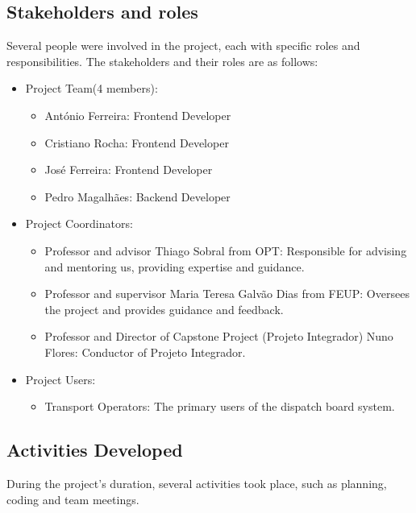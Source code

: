 \documentclass[10pt]{article}
\begin{document}
    \subsection{Stakeholders and roles}
        Several people were involved in the project, each with specific roles and responsibilities. The stakeholders and their roles are as follows:
        \begin{itemize}
            \item Project Team(4 members):
            \begin{itemize}
                \item António Ferreira: Frontend Developer
                \item Cristiano Rocha: Frontend Developer
                \item José Ferreira: Frontend Developer
                \item Pedro Magalhães: Backend Developer
            \end{itemize}
            \item Project Coordinators:
            \begin{itemize}
                \item Professor and advisor Thiago Sobral from OPT: Responsible for advising and mentoring us, providing expertise and guidance.
                \item Professor and supervisor Maria Teresa Galvão Dias from FEUP: Oversees the project and provides guidance and feedback.
                \item Professor and Director of Capstone Project (Projeto Integrador) Nuno Flores: Conductor of Projeto Integrador.
            \end{itemize}
            \item Project Users:
            \begin{itemize}
                \item Transport Operators: The primary users of the dispatch board system.
            \end{itemize}
        \end{itemize}

    \subsection{Activities Developed}
        During the project’s duration, several activities took place, such as planning, coding and team meetings.
\end{document}
